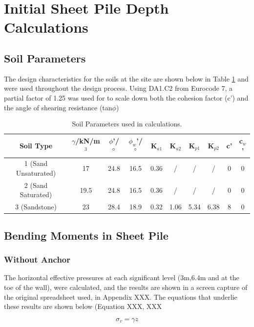 \documentclass[12pt, a4paper]{article}
\begin{document}
\section{Initial Sheet Pile Depth Calculations}
\subsection{Soil Parameters}
\begin{justify}
The design characteristics for the soils at the site are shown below in Table \ref{param} and were used throughout the design process. Using DA1.C2 from Eurocode 7, a partial factor of 1.25 was used for to scale down both the cohesion factor (c') and the angle of shearing resistance (tan$\phi$)
 
\end{justify}
\begin{table}[H]
\centering
\begin{tabular}{|c|c|c|c|c|c|c|c|c|c|}
\hline
     \textbf{Soil Type}& \textbf{$\gamma$/kN/m$^3$}& \textbf{$\phi$'/$\degree$}&\textbf{$\phi_w$'/$\degree$}&K$_{a1}$&K$_{a2}$&K$_{p1}$&K$_{p2}$&c'&c$_w$'\\ \hline
      1 (Sand Unsaturated)&17&24.8&16.5&0.36&/&/&/&0&0  \\ \hline
      2 (Sand Saturated) & 19.5&24.8&16.5&0.36&/&/&/&0&0  \\ \hline
      3 (Sandstone) & 23 &28.4&18.9&0.32&1.06&5.34&6.38&8&0 \\ \hline

\end{tabular}
\caption{Soil Parameters used in calculations.}
\label{param}
\end{table}
\subsection{Bending Moments in Sheet Pile}
\subsubsection{Without Anchor}
\begin{justify}
The horizontal effective pressures at each significant level (3m,6.4m and at the toe of the wall), were calculated, and the results are shown in a screen capture of the original spreadsheet used, in Appendix XXX. The equations that underlie these results are shown below (Equation XXX, XXX
\end{justify}
\begin{equation}
 \sigma_{v}=\gamma z   
 \label{sigv}
\end{equation}
\end{document}
